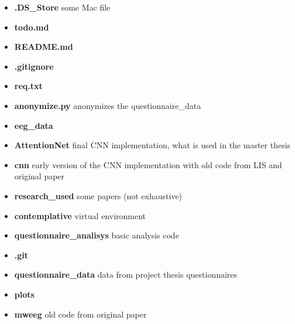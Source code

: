 \begin{footnotesize}
\begin{itemize}[label={}, leftmargin=*]
    \item \textbf{.DS\_Store}   some Mac file
    \item \textbf{todo.md}
    \item \textbf{README.md}
    \item \textbf{.gitignore}    
    \item \textbf{req.txt}
    \item \textbf{anonymize.py}     anonymizes the questionnaire\_data
    \item \textbf{eeg\_data}
    \item \textbf{AttentionNet}     final CNN implementation, what is used in the master thesis
    \item \textbf{cnn}      early version of the CNN implementation with old code from LIS and original paper
    \item \textbf{research\_used}   some papers (not exhaustive)
    \item \textbf{contemplative}    virtual environment
    \item \textbf{questionnaire\_analisys}  basic analysis code
    \item \textbf{.git}
    \item \textbf{questionnaire\_data}  data from project thesis questionnaires
    \item \textbf{plots}
    \item \textbf{mweeg} old code from original paper
\end{itemize}
\end{footnotesize}

